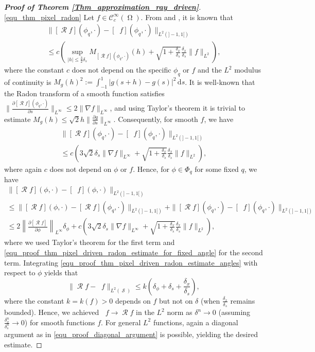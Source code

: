 \documentclass[11pt,reqno]{amsart}
\DeclareMathOperator{\Radon}{\mathcal{R}}
\DeclareMathOperator{\PixelRadon}{\mathcal{R}^\mathrm{pd}_{\delta}}
\DeclareMathOperator{\PixelRadonN}{\mathcal{R}^\mathrm{pd}_{\delta^n}}
\DeclareMathOperator{\imgdom}{\Omega}
\DeclareMathOperator{\sinodom}{\mathcal{S}}
\newcommand{\dd}[1]{\,\mathrm{d}{#1}}
\numberwithin{theorem}{section}
\theoremstyle{remark}
\begin{document}
\begin{proof}[\textbf{Proof of Theorem \ref{Thm_approximation_ray_driven}}]
\underline{\eqref{equ_thm_pixel_radon}}
Let $f\in \mathcal{C}^\infty_c(\imgdom)$. 
From \cite[Theorem 2.16 and its proof]{doi:10.1137/20M1326635} and \cite[Theorem III.2.30]{huber2022pixel}, it is known that
\begin{multline}
\|[\Radon f] (\phi_q,\cdot) - [\PixelRadon f](\phi_q,\cdot) \|_{L^2(]-1,1[)} 
\\ 
\leq c \left ( \sup_{|h|\leq \frac{3}{2}\delta_s}M_{[\Radon f](\phi_q,\cdot)}(h) + \sqrt{1+\frac{\delta_x}{\delta_s}}\frac{\delta_x}{\delta_s} \|f\|_{L^2}\right),
\end{multline}
where the constant $c$ does not depend on the specific $\phi_q$ or $f$ and the $L^2$ modulus of continuity is $M_g(h)^2:= \int_{-1}^1 | g(s+h)-g(s)|^2 \dd s$.
It is well-known that the Radon transform of a smooth function satisfies $\| \frac{\partial [\Radon f](\phi_q,\cdot)}{\partial s} \|_{L^\infty} \leq 2 \|\nabla f \|_{L^\infty}$, and using Taylor's theorem it is trivial to estimate $M_g(h)\leq \sqrt{2}h\|\frac{\partial g}{\partial s}\|_{L^\infty}$. Consequently, for smooth $f$, we have
\begin{multline}\label{equ_proof_thm_pixel_driven_radon_estimate_for_fixed_angle}
\|[\Radon f] (\phi_q,\cdot) - [\PixelRadon f](\phi_q,\cdot) \|_{L^2(]-1,1[)} 
\\
\leq c \left( 3  \sqrt{2} \delta_s\|\nabla f\|_{L^\infty}+ \sqrt{1+\frac{\delta_x}{\delta_s}}\frac{\delta_x}{\delta_s} \|f\|_{L^2}\right),
\end{multline}
where again $c$ does not depend on $\phi$ or $f$. Hence, for $\phi \in \Phi_q$ for some fixed $q$, we have
\begin{multline} \label{equ_proof_thm_pixel_driven_radon_estimate_angles}
\|[\Radon f] (\phi,\cdot) - [\PixelRadon f](\phi,\cdot) \|_{L^2(]-1,1[)}  
\\
\leq \|[\Radon f] (\phi,\cdot) - [\Radon f](\phi_q,\cdot) \|_{L^2(]-1,1[)} 
 + \|[\Radon f] (\phi_q,\cdot) - [\PixelRadon f](\phi_q,\cdot) \|_{L^2(]-1,1[)} 
\\
\leq 2 
\left\|\frac{\partial [\Radon f] }{\partial \phi} \right \|_{L^\infty} \delta_\phi + c \left( 3  \sqrt{2}\delta_s\|\nabla f\|_{L^\infty}+ \sqrt{1+\frac{\delta_x}{\delta_s}}\frac{\delta_x}{\delta_s} \|f\|_{L^2}\right),
\end{multline}
where we used Taylor's theorem for the first term and \eqref{equ_proof_thm_pixel_driven_radon_estimate_for_fixed_angle} for the second term.
Integrating \eqref{equ_proof_thm_pixel_driven_radon_estimate_angles} with respect to $\phi$ yields that 
\begin{equation}
\|\Radon f- \PixelRadon f\|_{L^2(\sinodom)} \leq k \left(\delta_\phi+\delta_s+\frac{\delta_x}{\delta_s}\right),
\end{equation}
where the constant $k=k(f)>0$ depends on $f$ but not on $\delta$ (when $\frac{\delta_x}{\delta_s}$ remains bounded). Hence, we achieved $\PixelRadonN f \to \Radon f$ in the $L^2$ norm as $\delta^n \to 0$ (assuming $\frac{\delta_x^n}{\delta_s^n} \to 0$) for smooth functions $f$. For general $L^2$ functions, again a diagonal argument as in \eqref{equ_proof_diagonal_argument} is possible, yielding the desired estimate.



\end{proof}
\end{document}
